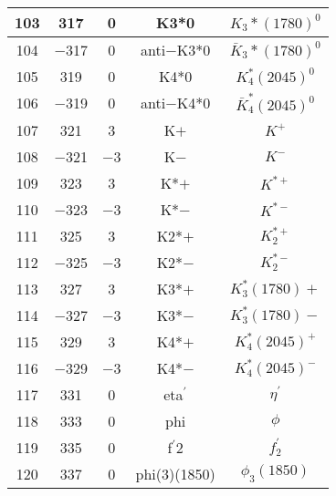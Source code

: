 \documentclass{article}
\begin{document}
\begin{table}[!htbp]
\begin{tabular}{|c|c|c|c|c|}
\hline
103 & 317 & 0 & K\underline{\hspace{0.6em}}3*0 & $K_{3}{*}(1780)^{0}$ \\
\hline
104 & $-$317 & 0 & anti$-$K\underline{\hspace{0.6em}}3*0 & $\bar{K}_{3}{*}(1780)^{0}$ \\
\hline
105 & 319 & 0 & K\underline{\hspace{0.6em}}4*0 & $K_{4}^{*}(2045)^{0}$ \\
\hline
106 & $-$319 & 0 & anti$-$K\underline{\hspace{0.6em}}4*0 & $\bar{K}_{4}^{*}(2045)^{0}$ \\
\hline
107 & 321 & 3 & K$+$ & $K^{+}$ \\
\hline
108 & $-$321 & $-$3 & K$-$ & $K^{-}$ \\
\hline
109 & 323 & 3 & K*$+$ & $K^{*+}$ \\
\hline
110 & $-$323 & $-$3 & K*$-$ & $K^{*-}$ \\
\hline
111 & 325 & 3 & K\underline{\hspace{0.6em}}2*$+$ & $K_2^{*+}$ \\
\hline
112 & $-$325 & $-$3 & K\underline{\hspace{0.6em}}2*$-$ & $K_2^{*-}$ \\
\hline
113 & 327 & 3 & K\underline{\hspace{0.6em}}3*$+$ & $K_{3}^{*}(1780){+}$ \\
\hline
114 & $-$327 & $-$3 & K\underline{\hspace{0.6em}}3*$-$ & $K_{3}^{*}(1780){-}$ \\
\hline
115 & 329 & 3 & K\underline{\hspace{0.6em}}4*$+$ & $K_{4}^{*}(2045)^{+}$ \\
\hline
116 & $-$329 & $-$3 & K\underline{\hspace{0.6em}}4*$-$ & $K_{4}^{*}(2045)^{-}$ \\
\hline
117 & 331 & 0 & eta$^{\prime}$ & $\eta^{\prime}$ \\
\hline
118 & 333 & 0 & phi & $\phi$ \\
\hline
119 & 335 & 0 & f$^{\prime}$\underline{\hspace{0.6em}}2 & $f_2^{'}$ \\
\hline
120 & 337 & 0 & phi(3)(1850) & $\phi_{3}(1850)$ \\
\hline
\end{tabular}
\end{table}

\clearpage
\end{document}
